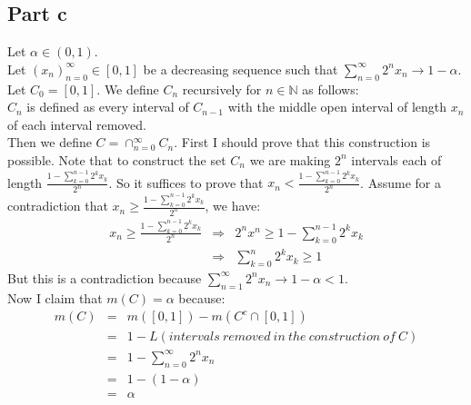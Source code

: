 \documentclass[12pt]{article}
\begin{document}
\subsection*{Part c}
Let $\alpha \in (0,1)$.\\
Let $(x_n)_{n=0}^{\infty} \in [0,1]$ be a decreasing sequence such that $\sum_{n=0}^{\infty} 2^nx_n \rightarrow 1-\alpha$. \\
Let $C_0=[0,1]$. We define $C_n$ recursively for $n \in \mathbb{N}$ as follows: \\
$C_n$ is defined as every interval of $C_{n-1}$ with the  middle open interval of length $x_n$ of each interval removed. \\
Then we define $C=\cap_{n=0}^{\infty} C_n$. First I should prove that this construction is possible.
Note that to construct the set $C_n$ we are making $2^n$ intervals each of length $\frac{1-\sum_{k=0}^{n-1} 2^kx_k}{2^n}$. So it suffices to prove that
$x_n < \frac{1-\sum_{k=0}^{n-1} 2^kx_k}{2^n}$.
Assume for a contradiction that
$x_n \ge \frac{1-\sum_{k=0}^{n-1} 2^kx_k}{2^n}$, we have:
\begin{eqnarray*}
x_n \ge \frac{1-\sum_{k=0}^{n-1} 2^kx_k}{2^n}
&\Rightarrow & 2^nx^n \ge 1-\sum_{k=0}^{n-1} 2^kx_k
\\ &\Rightarrow & 
\sum_{k=0}^{n} 2^kx_k \ge 1
\end{eqnarray*}
But this is a contradiction because $\sum_{n=1}^{\infty} 2^nx_n \rightarrow 1-\alpha < 1$. \\
Now I claim that $m(C)=\alpha$ because:
\begin{eqnarray*}
m(C) &=& m([0,1])-m(C^c \cap [0,1])
\\ &=&
1-L(intervals \ removed \ in \ the \ construction \ of \ C)
\\ &=&
1-\sum_{n=0}^{\infty} 2^nx_n
\\ &=&
1-(1-\alpha)
\\ &=&
\alpha
\end{eqnarray*}
\end{document}
